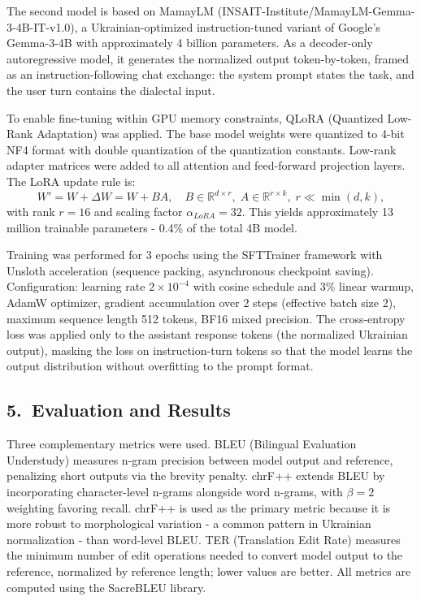 \documentclass[14pt]{extarticle}
\begin{document}
The second model is based on MamayLM (INSAIT-Institute/MamayLM-Gemma-3-4B-IT-v1.0), a
Ukrainian-optimized instruction-tuned variant of Google's Gemma-3-4B with approximately 4 billion
parameters. As a decoder-only autoregressive model, it generates the normalized output
token-by-token, framed as an instruction-following chat exchange: the system prompt states the
task, and the user turn contains the dialectal input.

To enable fine-tuning within GPU memory constraints, QLoRA (Quantized Low-Rank Adaptation) was
applied. The base model weights were quantized to 4-bit NF4 format with double quantization of
the quantization constants. Low-rank adapter matrices were added to all attention and feed-forward
projection layers. The LoRA update rule is:
\begin{equation}
W' = W + \Delta W = W + BA,
\quad B \in \mathbb{R}^{d \times r},\;
A \in \mathbb{R}^{r \times k},\;
r \ll \min(d, k),
\label{eq:abs_lora}
\end{equation}
with rank $r = 16$ and scaling factor $\alpha_{LoRA} = 32$. This yields approximately 13 million
trainable parameters - 0.4\% of the total 4B model.

Training was performed for 3 epochs using the SFTTrainer framework with Unsloth acceleration
(sequence packing, asynchronous checkpoint saving). Configuration: learning rate $2 \times 10^{-4}$
with cosine schedule and 3\% linear warmup, AdamW optimizer, gradient accumulation over 2 steps
(effective batch size 2), maximum sequence length 512 tokens, BF16 mixed precision. The
cross-entropy loss was applied only to the assistant response tokens (the normalized Ukrainian
output), masking the loss on instruction-turn tokens so that the model learns the output
distribution without overfitting to the prompt format.

\subsection*{5.~Evaluation and Results}

Three complementary metrics were used. BLEU (Bilingual Evaluation Understudy) measures n-gram
precision between model output and reference, penalizing short outputs via the brevity penalty.
chrF++ extends BLEU by incorporating character-level n-grams alongside word n-grams, with
$\beta = 2$ weighting favoring recall. chrF++ is used as the primary metric because it is more
robust to morphological variation - a common pattern in Ukrainian normalization - than word-level
BLEU. TER (Translation Edit Rate) measures the minimum number of edit operations needed to
convert model output to the reference, normalized by reference length; lower values are better.
All metrics are computed using the SacreBLEU library.
\end{document}
